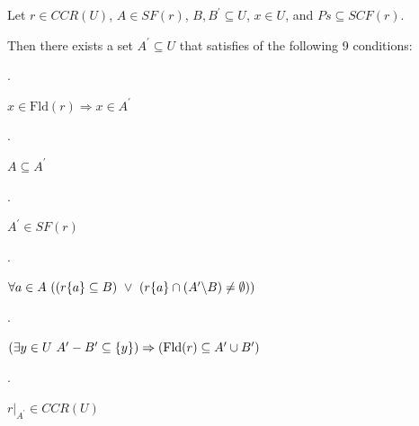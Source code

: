  
Let $r\in CCR(U)$, $A\in SF(r)$, $B,B^{\prime}\subseteq U$, $x\in U$, and $Ps\subseteq SCF(r)$.\par
 
 
 
Then there exists a set $A^{\prime}\subseteq U$ that satisfies of the following 9 conditions:\par
  
\par{}. 
 
$x\in\mathrm{Fld}(r)\Rightarrow x\in A^{\prime}$\par
 
 
 
\par{}. 
 
$A\subseteq A^{\prime}$\par
 
 
 
\par{}. 
 
$A^{\prime}\in SF(r)$\par
 
 
 
\par{}. 
 
$\forall a\in A\leavevmode\nobreak\ ((r\{a\}\subseteq B)\leavevmode\nobreak\ %
\vee\leavevmode\nobreak\ (r\{a\}\cap(A^{\prime}\backslash B)\neq\emptyset))$\par
 
 
 
\par{}. 
 
$(\exists y\in U\leavevmode\nobreak\ A^{\prime}-B^{\prime}\subseteq\{y\})%
\Rightarrow(\mathrm{Fld}(r)\subseteq A^{\prime}\cup B^{\prime})$\par
 
 
 
\par{}. 
 
$r|_{A^{\prime}}\in CCR(U)$\par
 
 
